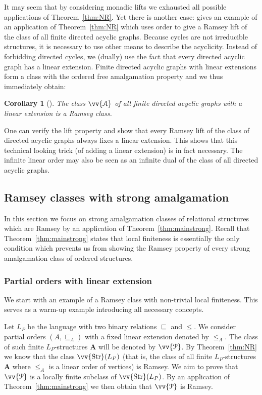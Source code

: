 \documentclass{elsarticle}
\def\Str{\mathop{\mathrm{Str}}\nolimits}
\def\ordclass#1{\vv{#1}}
\def\str#1{\mathbf {#1}}
\theoremstyle{plain}
\newtheorem{corollary}[theorem]{Corollary}
\theoremstyle{definition}
\theoremstyle{remark}
\begin{document}
It may seem that by considering monadic lifts  we exhausted all
possible applications of Theorem~\ref{thm:NR}.  Yet there is another case:
\cite{Nevsetvril1984} gives an example of an application of Theorem~\ref{thm:NR} 
which uses order to give a Ramsey lift of the class of all finite directed acyclic graphs.
 Because cycles are not irreducible structures, it is necessary to use other
 means to describe the acyclicity.  Instead of forbidding directed cycles, we
 (dually) use the fact that every directed acyclic graph has a linear extension. Finite directed acyclic graphs with linear extensions form a class with the ordered free amalgamation property and we thus immediately obtain:
\begin{corollary}[\cite{Nevsetvril1984}]
\label{cor:acyclic}
The class $\ordclass{\mathcal A}$ of all finite directed acyclic graphs with a linear extension is a Ramsey class.
\end{corollary}
 One can verify the lift property and show that every Ramsey lift of the
 class of directed acyclic graphs always fixes a linear extension. This
shows that this technical looking trick (of adding a linear extension) is in fact necessary. 
The infinite linear order may also be seen as an infinite dual of the class of all directed acyclic graphs.

\subsection {Ramsey classes with strong amalgamation}
\label{sec:examplesstrong}
In this section we focus on strong amalgamation classes of relational structures which are Ramsey by an application of Theorem~\ref{thm:mainstrong}.
Recall that Theorem~\ref{thm:mainstrong} states that local finiteness  is
essentially the only condition which prevents us from showing the Ramsey
property of every strong amalgamation class of ordered structures.

\subsubsection {Partial orders with linear extension}
\label{sec:posets}
We start with an example of a Ramsey class with non-trivial local finiteness.
This serves as a warm-up example introducing all necessary concepts.

Let $L_P$ be the language with two binary relations $\sqsubseteq$ and $\leq$.
We consider partial orders $(A,\sqsubseteq_A)$ with a fixed linear extension denoted by $\leq_A$. The class of such finite $L_P$-structures $\str{A}$ will be denoted  by $\ordclass{\mathcal P}$.
By Theorem~\ref{thm:NR} we know that the class $\ordclass{\Str}(L_P)$ (that is, the class of all finite $L_P$-structures $\str{A}$ where $\leq_A$ is a linear order of vertices) is Ramsey.
We aim to prove that $\ordclass{\mathcal P}$ is a locally finite subclass of $\ordclass{\Str}(L_P)$.
By an application of Theorem~\ref{thm:mainstrong} we then obtain that $\ordclass{\mathcal P}$ is Ramsey.
\end{document}
